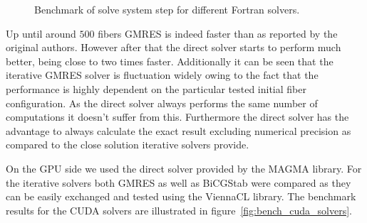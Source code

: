 \documentclass[a4paper,11pt]{kth-mag}
\begin{document}
\begin{figure}
  \centering
  \caption{Benchmark of solve system step for different Fortran solvers.}
  \label{fig:bench_openmp_solvers}
\end{figure}

Up until around $500$ fibers GMRES is indeed faster than as reported by the original authors. However after that the direct solver starts to perform much better, being close to two times faster. Additionally it can be seen that the iterative GMRES solver is fluctuation widely owing to the fact that the performance is highly dependent on the particular tested initial fiber configuration. As the direct solver always performs the same number of computations it doesn't suffer from this. Furthermore the direct solver has the advantage to always calculate the exact result excluding numerical precision as compared to the close solution iterative solvers provide.

On the GPU side we used the direct solver provided by the MAGMA library. For the iterative solvers both GMRES as well as BiCGStab were compared as they can be easily exchanged and tested using the ViennaCL library. The benchmark results for the CUDA solvers are illustrated in figure~\ref{fig:bench_cuda_solvers}.
\end{document}

